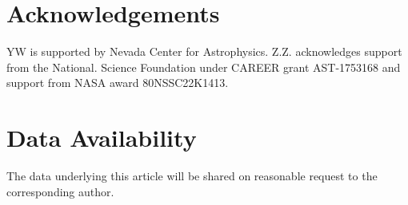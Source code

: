 \documentclass[fleqn,usenatbib]{mnras}
\begin{document}
\section*{Acknowledgements}
YW is supported by Nevada Center for Astrophysics. Z.Z. acknowledges support from the National. Science Foundation under CAREER grant AST-1753168 and support from NASA award 80NSSC22K1413. 
\section*{Data Availability}
The data underlying this article will be shared on reasonable request to the corresponding author.













\appendix



\bsp	%
\label{lastpage}
\end{document}
